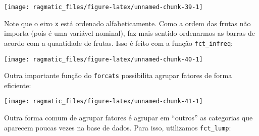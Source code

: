 \documentclass[]{book}
\newenvironment{Shaded}{\begin{snugshade}}{\end{snugshade}}
\newcommand{\KeywordTok}[1]{\textcolor[rgb]{0.13,0.29,0.53}{\textbf{{#1}}}}
\newcommand{\DataTypeTok}[1]{\textcolor[rgb]{0.13,0.29,0.53}{{#1}}}
\newcommand{\StringTok}[1]{\textcolor[rgb]{0.31,0.60,0.02}{{#1}}}
\newcommand{\NormalTok}[1]{{#1}}
\begin{document}
\begin{center}\texttt{[image: ragmatic\_files/figure-latex/unnamed-chunk-39-1]} \end{center}

Note que o eixo \texttt{x} está ordenado alfabeticamente. Como a ordem
das frutas não importa (pois é uma variável nominal), faz mais sentido
ordenarmos as barras de acordo com a quantidade de frutas. Isso é feito
com a função \texttt{fct\_infreq}:

\begin{Shaded}
\end{Shaded}

\begin{center}\texttt{[image: ragmatic\_files/figure-latex/unnamed-chunk-40-1]} \end{center}

Outra importante função do \texttt{forcats} possibilita agrupar fatores
de forma eficiente:

\begin{Shaded}
\end{Shaded}

\begin{center}\texttt{[image: ragmatic\_files/figure-latex/unnamed-chunk-41-1]} \end{center}

Outra forma comum de agrupar fatores é agrupar em ``outros'' as
categorias que aparecem poucas vezes na base de dados. Para isso,
utilizamos \texttt{fct\_lump}:

\begin{Shaded}
\end{Shaded}
\end{document}

